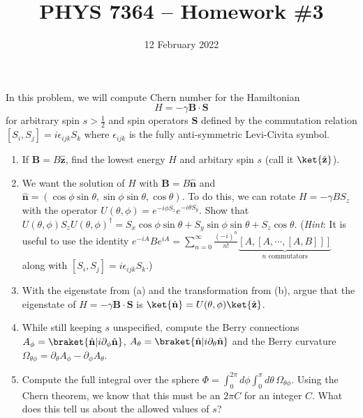 \documentclass{jhwhw}
\author{}
\title{PHYS 7364 -- Homework \#3}
\date{12 February 2022}
\begin{document}

In this problem, we will compute Chern number for the Hamiltonian
\begin{equation}
  \label{eq:3}
  H = - \gamma \mathbf B \cdot \mathbf S
\end{equation}
for arbitrary spin $s > \frac12$ and spin operators $\mathbf S$ defined by the commutation relation $[S_{i},S_{j}] = i \epsilon_{ijk} S_{k}$ where $\epsilon_{ijk}$ is the fully anti-symmetric Levi-Civita symbol.
\begin{enumerate}
  \item If $\mathbf B = B \hat{\mathbf z}$, find the lowest energy $H$ and arbitary spin $s$ (call it $\ket{\hat{\mathbf z}}$).
  \item We want the solution of $H$ with $\mathbf B = B \hat{ \mathbf n}$ and $\hat{\mathbf n} = (\cos\phi \sin\theta, \sin\phi \sin\theta, \cos\theta)$. To do this, we can rotate $H = -\gamma B S_{z}$ with the operator $U(\theta,\phi) = e^{-i\phi S_{z}} e^{-i \theta S_{y}}$. Show that $U(\theta,\phi) S_{z} U(\theta, \phi)^{\dagger} = S_{x} \cos \phi \sin \theta + S_{y} \sin\phi \sin \theta + S_{z} \cos \theta$. (\emph{Hint}: It is useful to use the identity $e^{-i A}B e^{i A} = \sum_{n=0}^{\infty} \frac{(-i)^{n}}{n!} \underbrace{[A, [A, \cdots, [A, B]]]}_{n \text{ commutators}}$ along with $[S_{i},S_{j}] = i \epsilon_{ijk} S_{k}$.)
  \item With the eigenstate from (a) and the transformation from (b), argue that the eigenstate of $H = -\gamma \mathbf B \cdot \mathbf S$ is $\ket{\hat{\mathbf n}} = U(\theta, \phi) \ket{\hat{\mathbf z}}$.
  \item While still keeping $s$ unspecified, compute the Berry connections $A_{\phi} = \braket{\hat{\mathbf n} | i\partial_{\phi} \hat{\mathbf n}}$, $A_{\theta} = \braket{\hat{\mathbf n} | i\partial_{\theta} \hat{\mathbf n}}$ and the Berry curvature $\Omega_{\theta \phi} = \partial_{\theta} A_{\phi} - \partial_{\phi} A_{\theta}$.
  \item Compute the full integral over the sphere $\Phi = \int_{0}^{2\pi} d\phi \int_{0}^{\pi} d\theta \, \Omega_{\theta \phi}$. Using the Chern theorem, we know that this must be an $2\pi C$ for an integer $C$. What does this tell us about the allowed values of $s$?
\end{enumerate}


\end{document}
